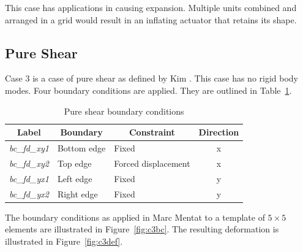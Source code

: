 This case has applications in causing expansion. Multiple units combined and arranged in a grid would result in an inflating actuator that retains its shape.

\subsection{Pure Shear}

Case 3 is a case of pure shear as defined by Kim \citep{Kim2015}. This case has no rigid body modes. Four boundary conditions are applied. They are outlined in Table~\ref{tab:c3}.

\begin{table}[H]
\centering
\begin{tabular}{@{}lllc@{}}
\toprule
\multicolumn{1}{c}{\textbf{Label}} & \multicolumn{1}{c}{\textbf{Boundary}} & \multicolumn{1}{c}{\textbf{Constraint}} & \textbf{Direction} \\ \midrule
\textit{bc\_fd\_xy1} & Bottom edge & Fixed               & x \\
\textit{bc\_fd\_xy2} & Top edge    & Forced displacement & x \\
\textit{bc\_fd\_yx1} & Left edge   & Fixed               & y \\
\textit{bc\_fd\_yx2} & Right edge  & Fixed				 & y \\ \bottomrule
\end{tabular}
\caption[Pure shear boundary conditions]{Pure shear boundary conditions \citep{Kim2015}}
\label{tab:c3}
\end{table}

The boundary conditions as applied in Marc Mentat to a template of $5\times 5$ elements are illustrated in Figure~\ref{fig:c3bc}. The resulting deformation is illustrated in Figure~\ref{fig:c3def}.

